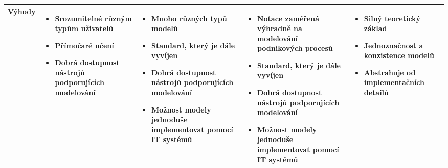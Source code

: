 \begin{center}
\begin{longtable}{|p{2cm}|p{3cm}|p{3cm}|p{3cm}|p{3cm}|}
\textbf{Výhody} & 
\begin{itemize} 
  \item Srozumitelné různým typům uživatelů
  \item Přímočaré učení
  \item Dobrá dostupnost nástrojů podporujících modelování
\end{itemize} & 
\begin{itemize}
  \item Mnoho různých typů modelů
  \item Standard, který je dále vyvíjen
  \item Dobrá dostupnost nástrojů podporujících modelování
  \item Možnost modely jednoduše implementovat pomocí IT systémů
\end{itemize} & 
\begin{itemize}
  \item Notace zaměřená výhradně na modelování podnikových procesů
  \item Standard, který je dále vyvíjen
  \item Dobrá dostupnost nástrojů podporujících modelování
  \item Možnost modely jednoduše implementovat pomocí IT systémů
\end{itemize} &
\begin{itemize}
  \item Silný teoretický základ
  \item Jednoznačnost a konzistence modelů
  \item Abstrahuje od implementačních detailů
\end{itemize} \\  \hline
\end{longtable}
\end{center}